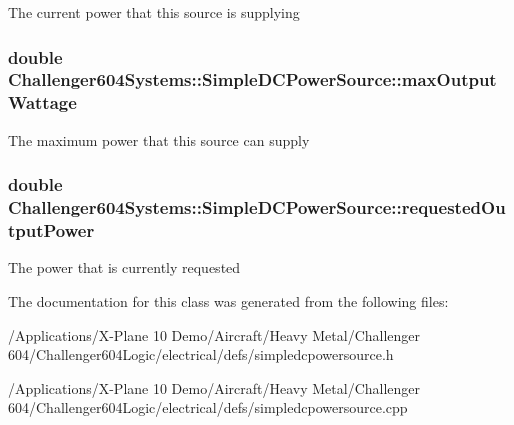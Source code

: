 The current power that this source is supplying \hypertarget{class_challenger604_systems_1_1_simple_d_c_power_source_a47660a2b69c6c426bf4cf684de7b8f52}{
\subsubsection[{max\-Output\-Wattage}]{\setlength{\rightskip}{0pt plus 5cm}double Challenger604\-Systems\-::\-Simple\-D\-C\-Power\-Source\-::max\-Output\-Wattage\hspace{0.3cm}{\ttfamily [protected]}}}\label{class_challenger604_systems_1_1_simple_d_c_power_source_a47660a2b69c6c426bf4cf684de7b8f52}
The maximum power that this source can supply \hypertarget{class_challenger604_systems_1_1_simple_d_c_power_source_a44427ce8f77ab04a8f2fc0cd17e7e936}{
\subsubsection[{requested\-Output\-Power}]{\setlength{\rightskip}{0pt plus 5cm}double Challenger604\-Systems\-::\-Simple\-D\-C\-Power\-Source\-::requested\-Output\-Power\hspace{0.3cm}{\ttfamily [protected]}}}\label{class_challenger604_systems_1_1_simple_d_c_power_source_a44427ce8f77ab04a8f2fc0cd17e7e936}
The power that is currently requested 

The documentation for this class was generated from the following files\-:\begin{DoxyCompactItemize}
\item 
/\-Applications/\-X-\/\-Plane 10 Demo/\-Aircraft/\-Heavy Metal/\-Challenger 604/\-Challenger604\-Logic/electrical/defs/simpledcpowersource.\-h\item 
/\-Applications/\-X-\/\-Plane 10 Demo/\-Aircraft/\-Heavy Metal/\-Challenger 604/\-Challenger604\-Logic/electrical/defs/simpledcpowersource.\-cpp\end{DoxyCompactItemize}
